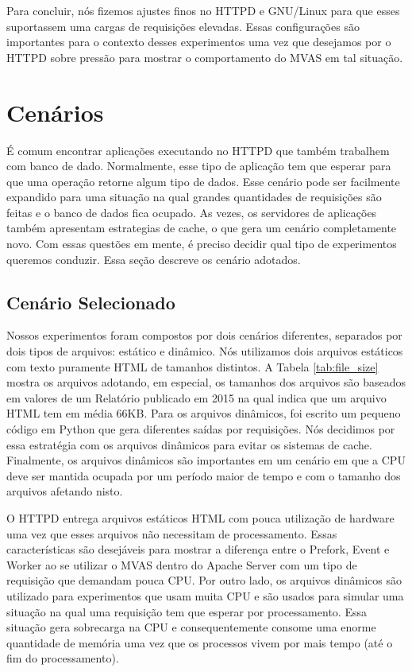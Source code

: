 Para concluir, nós fizemos ajustes finos no HTTPD e GNU/Linux para que esses
suportassem uma cargas de requisições elevadas. Essas configurações são
importantes para o contexto desses experimentos uma vez que desejamos por o
HTTPD sobre pressão para mostrar o comportamento do MVAS em tal situação.

\section{Cenários}

É comum encontrar aplicações executando no HTTPD que também trabalhem com banco de
dado. Normalmente, esse tipo de aplicação tem que esperar para que uma
operação retorne algum tipo de dados. Esse cenário pode ser facilmente
expandido para uma situação na qual grandes quantidades de requisições são
feitas e o banco de dados fica ocupado. As vezes, os servidores de aplicações
também apresentam estrategias de cache, o que gera um cenário completamente
novo. Com essas questões em mente, é preciso decidir qual tipo de experimentos
queremos conduzir. Essa seção descreve os cenário adotados.

\subsection{Cenário Selecionado} \label{sec:scenarios}



Nossos experimentos foram compostos por dois cenários diferentes, separados por dois
tipos de arquivos: estático e dinâmico. Nós utilizamos dois arquivos estáticos
com texto puramente HTML de tamanhos distintos. A Tabela \ref{tab:file_size}
mostra os arquivos adotando, em especial, os tamanhos dos arquivos são baseados
em valores de um Relatório publicado em 2015 na qual indica que um arquivo HTML
tem em média 66KB. Para os arquivos dinâmicos, foi escrito
um pequeno código em Python que gera diferentes saídas por requisições. Nós
decidimos por essa estratégia com os arquivos dinâmicos para evitar os sistemas
de cache. Finalmente, os arquivos dinâmicos são importantes em um cenário em
que a CPU deve ser mantida ocupada por um período maior de tempo e com o
tamanho dos arquivos afetando nisto.

O HTTPD entrega arquivos estáticos HTML com pouca utilização de hardware uma
vez que esses arquivos não necessitam de processamento. Essas características
são desejáveis para mostrar a diferença entre o Prefork, Event e Worker ao se
utilizar o MVAS dentro do Apache Server com um tipo de requisição que demandam
pouca CPU. Por outro lado, os arquivos dinâmicos são utilizado para
experimentos que usam muita CPU e são usados para simular uma situação na qual
uma requisição tem que esperar por processamento. Essa situação gera sobrecarga
na CPU e consequentemente consome uma enorme quantidade de memória uma vez que
os processos vivem por mais tempo (até o fim do processamento).


